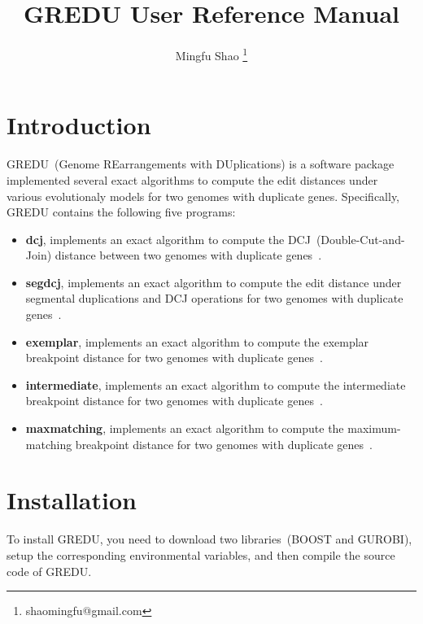 \documentclass[11pt, a4paper]{article}
\begin{document}
\title{GREDU User Reference Manual}

\author{Mingfu Shao \thanks{shaomingfu@gmail.com}}


\maketitle            

\section{Introduction}
GREDU~(Genome REarrangements with DUplications) is a software package
implemented several exact algorithms to compute the edit distances under
various evolutionaly models for two genomes with duplicate genes.
Specifically, GREDU contains the following five programs:
\begin{itemize}
\item[1.] {\bf dcj}, implements an exact algorithm to compute the
DCJ~(Double-Cut-and-Join) distance between two genomes with duplicate
genes~\cite{shao14a}.
\item[2.] {\bf segdcj}, implements an exact algorithm to compute the edit
distance under segmental duplications and DCJ operations for two genomes with
duplicate genes~\cite{shao15c}.
\item[3.] {\bf exemplar}, implements an exact algorithm to compute the exemplar
breakpoint distance for two genomes with duplicate genes~\cite{shao15a}.
\item[4.] {\bf intermediate}, implements an exact algorithm to compute the
intermediate breakpoint distance for two genomes with duplicate genes~\cite{shao16}.
\item[5.] {\bf maxmatching}, implements an exact algorithm to compute the
maximum-matching breakpoint distance for two genomes with duplicate genes~\cite{shao16}.
\end{itemize}

\section{Installation}
To install GREDU, you need to download two libraries~(BOOST and GUROBI),
setup the corresponding environmental variables, and then
compile the source code of GREDU.
\end{document}
